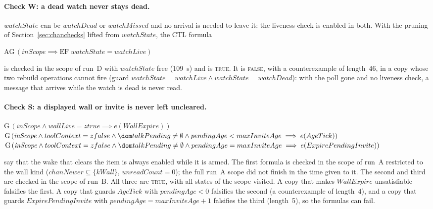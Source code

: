 \documentclass[a4paper,10pt,fleqn]{article}
\begin{document}
\paragraph{Check W: a dead watch never stays dead.}  $watchState$ can be
$watchDead$ or $watchMissed$ and no arrival is needed to leave it: the
liveness check is enabled in both.  With the pruning of
Section~\ref{sec:chanchecks} lifted from $watchState$, the CTL formula
\begin{center}
$\mathrm{AG}\,(\mathit{inScope} \implies \mathrm{EF}\; watchState =
watchLive)$
\end{center}
is checked in the scope of run~D with $watchState$ free (109~s) and is
\textsc{true}.  It is \textsc{false}, with a counterexample of length~46, in a
copy whose two rebuild operations cannot fire (guard $watchState = watchLive
\land watchState = watchDead$): with the poll gone and no liveness check, a
message that arrives while the watch is dead is never read.

\paragraph{Check S: a displayed wall or invite is never left uncleared.}
\begin{center}
$\mathrm{G}\,(\mathit{inScope} \land wallLive = ztrue \implies
e(WallExpire))$ \\
$\mathrm{G}\,(\mathit{inScope} \land toolContext = zfalse \land
\dom talkPending \neq \emptyset \land pendingAge < maxInviteAge \implies
e(AgeTick))$ \\
$\mathrm{G}\,(\mathit{inScope} \land toolContext = zfalse \land
\dom talkPending \neq \emptyset \land pendingAge = maxInviteAge \implies
e(ExpirePendingInvite))$
\end{center}
say that the wake that clears the item is always enabled while it is armed.
The first formula is checked in the scope of run~A restricted to the wall kind
($chanNewer \subseteq \{ kWall \}$, $unreadCount = 0$); the full run~A scope
did not finish in the time given to it.  The second and third are checked in the
scope of run~B.  All three are \textsc{true}, with all states of the scope
visited.  A copy that makes $WallExpire$ unsatisfiable falsifies the first.  A copy that guards $AgeTick$ with $pendingAge < 0$ falsifies the
second (a counterexample of length~4), and a copy that guards
$ExpirePendingInvite$ with $pendingAge = maxInviteAge + 1$ falsifies the third
(length~5), so the formulas can fail.

\end{document}

